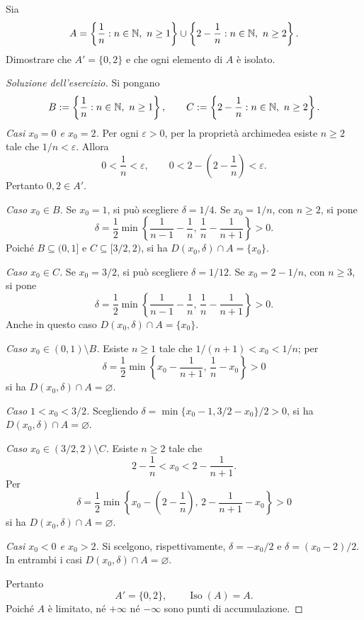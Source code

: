 \begin{exercise}
\label{ex:fondamenti-due-successioni-accumulazione}
Sia
\[
  A=\left\{\frac1n:n\in\mathbb{N},\ n\ge1\right\}\cup
    \left\{2-\frac1n:n\in\mathbb{N},\ n\ge2\right\}.
\]
Dimostrare che $A'=\{0,2\}$ e che ogni elemento di $A$
è isolato.
\end{exercise}
\begin{proof}[Soluzione dell'esercizio]
Si pongano
\[
  B:=\left\{\frac1n:n\in\mathbb{N},\ n\ge1\right\},
  \qquad
  C:=\left\{2-\frac1n:n\in\mathbb{N},\ n\ge2\right\}.
\]
\emph{Casi $x_0=0$ e $x_0=2$.} Per ogni
$\varepsilon>0$, per la proprietà archimedea esiste
$n\ge2$ tale che $1/n<\varepsilon$. Allora
\[
  0<\frac1n<\varepsilon,
  \qquad 0<2-\left(2-\frac1n\right)<\varepsilon.
\]
Pertanto $0,2\in A'$.

\emph{Caso $x_0\in B$.} Se $x_0=1$, si può scegliere
$\delta=1/4$. Se $x_0=1/n$, con $n\ge2$, si pone
\[
  \delta=\frac12\min\left\{
    \frac1{n-1}-\frac1n,\,
    \frac1n-\frac1{n+1}\right\}>0.
\]
Poiché $B\subseteq(0,1]$ e $C\subseteq[3/2,2)$,
si ha $D(x_0,\delta)\cap A=\{x_0\}$.

\emph{Caso $x_0\in C$.} Se $x_0=3/2$, si può scegliere
$\delta=1/12$. Se $x_0=2-1/n$, con $n\ge3$, si pone
\[
  \delta=\frac12\min\left\{
    \frac1{n-1}-\frac1n,\,
    \frac1n-\frac1{n+1}\right\}>0.
\]
Anche in questo caso $D(x_0,\delta)\cap A=\{x_0\}$.

\emph{Caso $x_0\in(0,1)\setminus B$.} Esiste $n\ge1$
tale che $1/(n+1)<x_0<1/n$; per
\[
  \delta=\frac12\min\left\{
    x_0-\frac1{n+1},\,\frac1n-x_0\right\}>0
\]
si ha $D(x_0,\delta)\cap A=\varnothing$.

\emph{Caso $1<x_0<3/2$.} Scegliendo
$\delta=\min\{x_0-1,3/2-x_0\}/2>0$,
si ha $D(x_0,\delta)\cap A=\varnothing$.

\emph{Caso $x_0\in(3/2,2)\setminus C$.} Esiste $n\ge2$
tale che
\[
  2-\frac1n<x_0<2-\frac1{n+1}.
\]
Per
\[
  \delta=\frac12\min\left\{
    x_0-\left(2-\frac1n\right),\,
    2-\frac1{n+1}-x_0\right\}>0
\]
si ha $D(x_0,\delta)\cap A=\varnothing$.

\emph{Casi $x_0<0$ e $x_0>2$.} Si scelgono,
rispettivamente, $\delta=-x_0/2$ e $\delta=(x_0-2)/2$.
In entrambi i casi $D(x_0,\delta)\cap A=\varnothing$.

Pertanto
\[
  A'=\{0,2\},\qquad \operatorname{Iso}(A)=A.
\]
Poiché $A$ è limitato, né $+\infty$ né $-\infty$
sono punti di accumulazione.
\end{proof}

